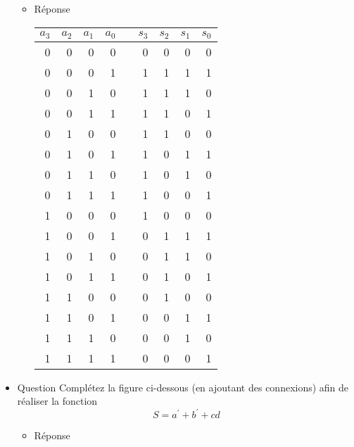 \documentclass[letter, oneside]{book}
\begin{document}
\begin{itemize}
\begin{itemize}
\item Réponse
\label{sec:orgbfa6300}
\begin{center}
\begin{tabular}{rrrrlrrrr}
\(a_3\) & \(a_2\) & \(a_1\) & \(a_0\) &  & \(s_3\) & \(s_2\) & \(s_1\) & \(s_0\)\\[0pt]
\hline
0 & 0 & 0 & 0 &  & 0 & 0 & 0 & 0\\[0pt]
0 & 0 & 0 & 1 &  & 1 & 1 & 1 & 1\\[0pt]
0 & 0 & 1 & 0 &  & 1 & 1 & 1 & 0\\[0pt]
0 & 0 & 1 & 1 &  & 1 & 1 & 0 & 1\\[0pt]
0 & 1 & 0 & 0 &  & 1 & 1 & 0 & 0\\[0pt]
0 & 1 & 0 & 1 &  & 1 & 0 & 1 & 1\\[0pt]
0 & 1 & 1 & 0 &  & 1 & 0 & 1 & 0\\[0pt]
0 & 1 & 1 & 1 &  & 1 & 0 & 0 & 1\\[0pt]
1 & 0 & 0 & 0 &  & 1 & 0 & 0 & 0\\[0pt]
1 & 0 & 0 & 1 &  & 0 & 1 & 1 & 1\\[0pt]
1 & 0 & 1 & 0 &  & 0 & 1 & 1 & 0\\[0pt]
1 & 0 & 1 & 1 &  & 0 & 1 & 0 & 1\\[0pt]
1 & 1 & 0 & 0 &  & 0 & 1 & 0 & 0\\[0pt]
1 & 1 & 0 & 1 &  & 0 & 0 & 1 & 1\\[0pt]
1 & 1 & 1 & 0 &  & 0 & 0 & 1 & 0\\[0pt]
1 & 1 & 1 & 1 &  & 0 & 0 & 0 & 1\\[0pt]
\end{tabular}
\end{center}
\end{itemize}

\item Question
\label{sec:orgba8dbf9}
Complétez la figure ci-dessous (en ajoutant des connexions) afin de
réaliser la fonction $$S= a^{\prime} + b^{\prime} + c d$$

\begin{center}

\end{center}

\begin{itemize}
\item Réponse
\label{sec:orga4897ba}
\begin{center}

\end{center}
\end{itemize}


\end{itemize}
\end{document}
